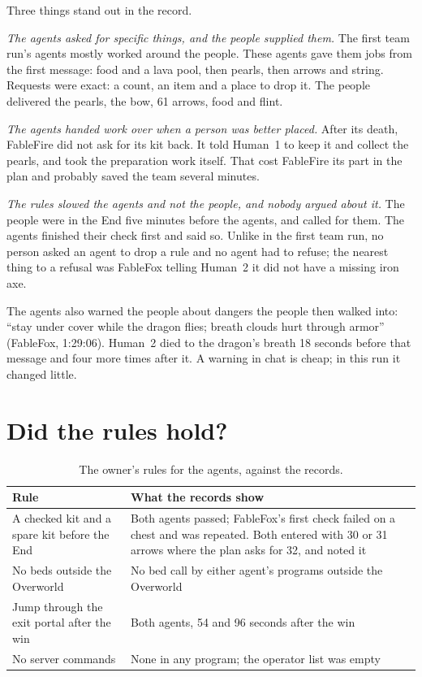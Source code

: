 \documentclass[11pt,a4paper]{article}
\begin{document}
Three things stand out in the record.

\emph{The agents asked for specific things, and the people supplied them.} The first team run's agents mostly worked around the people. These agents gave them jobs from the first message: food and a lava pool, then pearls, then arrows and string. Requests were exact: a count, an item and a place to drop it. The people delivered the pearls, the bow, 61 arrows, food and flint.

\emph{The agents handed work over when a person was better placed.} After its death, FableFire did not ask for its kit back. It told Human~1 to keep it and collect the pearls, and took the preparation work itself. That cost FableFire its part in the plan and probably saved the team several minutes.

\emph{The rules slowed the agents and not the people, and nobody argued about it.} The people were in the End five minutes before the agents, and called for them. The agents finished their check first and said so. Unlike in the first team run, no person asked an agent to drop a rule and no agent had to refuse; the nearest thing to a refusal was FableFox telling Human~2 it did not have a missing iron axe.

The agents also warned the people about dangers the people then walked into: ``stay under cover while the dragon flies; breath clouds hurt through armor'' (FableFox, 1:29:06). Human~2 died to the dragon's breath 18 seconds before that message and four more times after it. A warning in chat is cheap; in this run it changed little.

\section{Did the rules hold?}
\label{sec:rules}

\begin{table}[t]
  \caption{The owner's rules for the agents, against the records.}
  \label{tab:rules}
  \small
  \begin{tabularx}{\textwidth}{@{}>{\raggedright\arraybackslash}p{4.6cm}>{\raggedright\arraybackslash}X@{}}
    \toprule
    \textbf{Rule} & \textbf{What the records show} \\
    \midrule
    A checked kit and a spare kit before the End & Both agents passed; FableFox's first check failed on a chest and was repeated. Both entered with 30 or 31 arrows where the plan asks for 32, and noted it \\
    No beds outside the Overworld & No bed call by either agent's programs outside the Overworld \\
    Jump through the exit portal after the win & Both agents, 54 and 96 seconds after the win \\
    No server commands & None in any program; the operator list was empty \\
    \bottomrule
  \end{tabularx}
\end{table}
\end{document}
